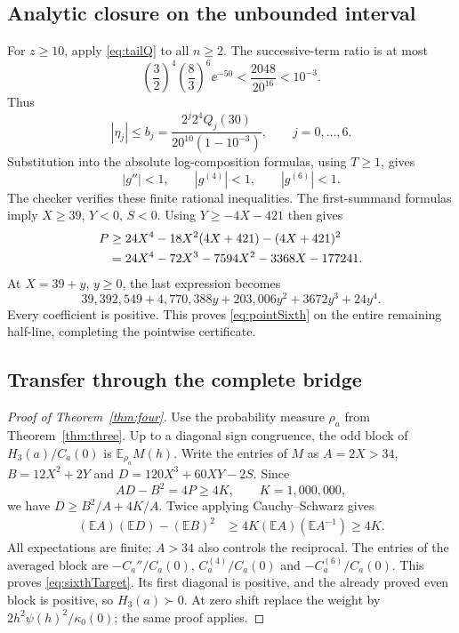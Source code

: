 \subsection{Analytic closure on the unbounded interval}
For $z\ge10$, apply \eqref{eq:tailQ} to all $n\ge2$. The successive-term ratio is at most
\[
\left(\frac32\right)^4\left(\frac83\right)^6\ee^{-50}
<\frac{2048}{20^{16}}<10^{-3}.
\]
Thus
\[
|\eta_j|\le b_j=\frac{2^j2^4Q_j(30)}{20^{10}(1-10^{-3})},
\qquad j=0,\ldots,6.
\]
Substitution into the absolute log-composition formulas, using $T\ge1$, gives
\[
|g''|<1,\qquad |g^{(4)}|<1,\qquad |g^{(6)}|<1.
\]
The checker verifies these finite rational inequalities. The first-summand formulas imply
$X\ge39$, $Y<0$, $S<0$. Using $Y\ge-4X-421$ then gives
\begin{align}
P&\ge24X^4-18X^2(4X+421)-(4X+421)^2\notag\\
&=24X^4-72X^3-7594X^2-3368X-177241.
\end{align}
At $X=39+y$, $y\ge0$, the last expression becomes
\[
39{,}392{,}549+4{,}770{,}388y+203{,}006y^2+3672y^3+24y^4.
\]
Every coefficient is positive. This proves \eqref{eq:pointSixth} on the entire remaining half-line, completing the pointwise certificate.

\subsection{Transfer through the complete bridge}
\begin{proof}[Proof of Theorem~\ref{thm:four}]
Use the probability measure $\rho_a$ from Theorem~\ref{thm:three}. Up to a diagonal sign congruence, the odd block of $H_3(a)/C_a(0)$ is $\mathbb E_{\rho_a}M(h)$. Write the entries of $M$ as $A=2X>34$, $B=12X^2+2Y$ and $D=120X^3+60XY-2S$. Since
\[
AD-B^2=4P\ge4K,\qquad K=1{,}000{,}000,
\]
we have $D\ge B^2/A+4K/A$. Twice applying Cauchy--Schwarz gives
\begin{align}
(\mathbb EA)(\mathbb ED)-(\mathbb EB)^2
&\ge4K(\mathbb EA)(\mathbb EA^{-1})\ge4K.
\end{align}
All expectations are finite; $A>34$ also controls the reciprocal. The entries of the averaged block are $-C_a''/C_a(0)$, $C_a^{(4)}/C_a(0)$ and $-C_a^{(6)}/C_a(0)$. This proves \eqref{eq:sixthTarget}. Its first diagonal is positive, and the already proved even block is positive, so $H_3(a)\succ0$. At zero shift replace the weight by $2h^2\psi(h)^2/\kappa_0(0)$; the same proof applies.
\end{proof}


